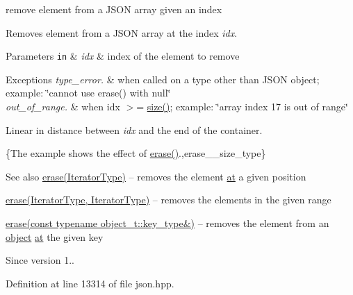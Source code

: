 remove element from a J\+S\+ON array given an index 

Removes element from a J\+S\+ON array at the index {\itshape idx}.


\begin{DoxyParams}[1]{Parameters}
\mbox{\tt in}  & {\em idx} & index of the element to remove\\
\hline
\end{DoxyParams}

\begin{DoxyExceptions}{Exceptions}
{\em type\+\_\+error.} & when called on a type other than J\+S\+ON object; example\+: {\ttfamily \char`\"{}cannot use erase() with null\char`\"{}} \\
\hline
{\em out\+\_\+of\+\_\+range.} & when {\ttfamily idx $>$= \hyperlink{classnlohmann_1_1basic__json_a25e27ad0c6d53c01871c5485e1f75b96}{size()}}; example\+: {\ttfamily \char`\"{}array index 17
is out of range\char`\"{}}\\
\hline
\end{DoxyExceptions}
Linear in distance between {\itshape idx} and the end of the container.

\{The example shows the effect of {\ttfamily \hyperlink{classnlohmann_1_1basic__json_a068a16e76be178e83da6a192916923ed}{erase()}}.,erase\+\_\+\+\_\+size\+\_\+type\}

\begin{DoxySeeAlso}{See also}
\hyperlink{classnlohmann_1_1basic__json_a068a16e76be178e83da6a192916923ed}{erase(\+Iterator\+Type)} -- removes the element \hyperlink{classnlohmann_1_1basic__json_a73ae333487310e3302135189ce8ff5d8}{at} a given position 

\hyperlink{classnlohmann_1_1basic__json_a4b3f7eb2d4625d95a51fbbdceb7c5f39}{erase(\+Iterator\+Type, Iterator\+Type)} -- removes the elements in the given range 

\hyperlink{classnlohmann_1_1basic__json_a2f8484d69c55d8f2a9697a7bec29362a}{erase(const typename object\+\_\+t\+::key\+\_\+type\&)} -- removes the element from an \hyperlink{classnlohmann_1_1basic__json_aa13f7c0615867542ce80337cbcf13ada}{object} \hyperlink{classnlohmann_1_1basic__json_a73ae333487310e3302135189ce8ff5d8}{at} the given key
\end{DoxySeeAlso}
\begin{DoxySince}{Since}
version 1.. 
\end{DoxySince}


Definition at line 13314 of file json.\+hpp.



